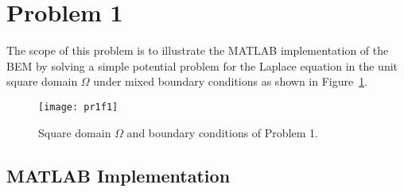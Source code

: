 
\section{Problem 1}
\label{sec:problem_1}%

The scope of this problem is to illustrate the MATLAB implementation of the BEM by solving a simple potential problem for the Laplace equation in the unit square domain $\Omega$ under mixed boundary conditions as shown in Figure~\ref{fig:2pr1f1}.

\begin{figure}[H]
    \centering
    \texttt{[image: pr1f1]}
    \caption{Square domain $\Omega$ and boundary conditions of Problem 1.}
    \label{fig:2pr1f1}
\end{figure}


\subsection{MATLAB Implementation}
\label{sub:MATLAB_implementation2}%

